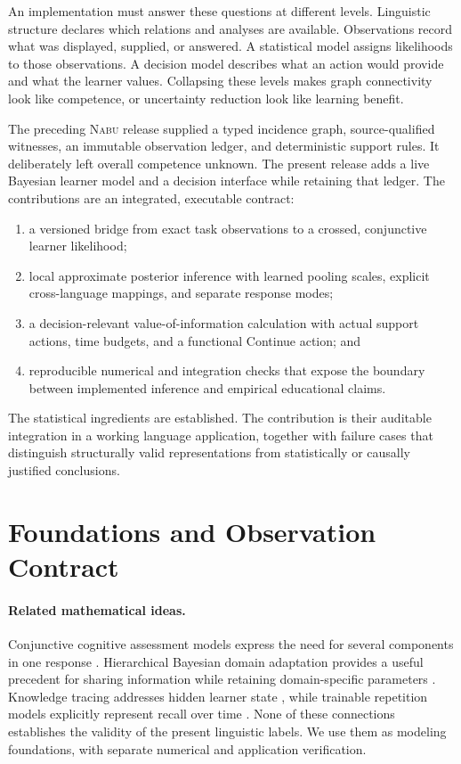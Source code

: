 \documentclass{article}
\newcommand{\Nabu}{\textsc{Nabu}}
\begin{document}
An implementation must answer these questions at different levels. Linguistic
structure declares which relations and analyses are available. Observations
record what was displayed, supplied, or answered. A statistical model assigns
likelihoods to those observations. A decision model describes what an action
would provide and what the learner values. Collapsing these levels makes
graph connectivity look like competence, or uncertainty reduction look like
learning benefit.

The preceding \Nabu{} release supplied a typed incidence graph, source-qualified
witnesses, an immutable observation ledger, and deterministic support rules.
It deliberately left overall competence unknown. The present release adds a
live Bayesian learner model and a decision interface while retaining that
ledger. The contributions are an integrated, executable contract:

\begin{enumerate}
\item a versioned bridge from exact task observations to a crossed,
conjunctive learner likelihood;
\item local approximate posterior inference with learned pooling scales,
explicit cross-language mappings, and separate response modes;
\item a decision-relevant value-of-information calculation with actual
support actions, time budgets, and a functional Continue action; and
\item reproducible numerical and integration checks that expose the boundary
between implemented inference and empirical educational claims.
\end{enumerate}

The statistical ingredients are established. The contribution is their
auditable integration in a working language application, together with
failure cases that distinguish structurally valid representations from
statistically or causally justified conclusions.

\section{Foundations and Observation Contract}

\paragraph{Related mathematical ideas.}
Conjunctive cognitive assessment models express the need for several
components in one response \citep{junker2001cognitive}. Hierarchical Bayesian
domain adaptation provides a useful precedent for sharing information while
retaining domain-specific parameters \citep{finkel2009hierarchical}.
Knowledge tracing addresses hidden learner state
\citep{corbett1994knowledge}, while trainable repetition models explicitly
represent recall over time \citep{settles2016trainable}. None of these
connections establishes the validity of the present linguistic labels.
We use them as modeling foundations, with separate numerical and application
verification.
\end{document}
